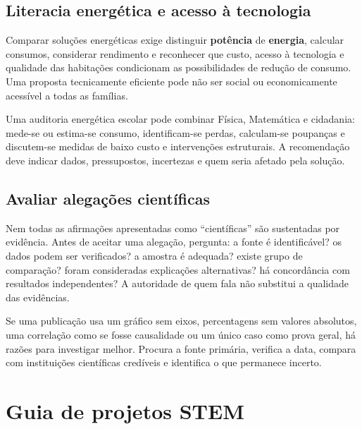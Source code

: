 \documentclass[11pt,a4paper,oneside]{book}
\begin{document}
\section{Literacia energética e acesso à tecnologia}
Comparar soluções energéticas exige distinguir \textbf{potência} de \textbf{energia}, calcular consumos, considerar rendimento e reconhecer que custo, acesso à tecnologia e qualidade das habitações condicionam as possibilidades de redução de consumo. Uma proposta tecnicamente eficiente pode não ser social ou economicamente acessível a todas as famílias.

\begin{mundo}
Uma auditoria energética escolar pode combinar Física, Matemática e cidadania: mede-se ou estima-se consumo, identificam-se perdas, calculam-se poupanças e discutem-se medidas de baixo custo e intervenções estruturais. A recomendação deve indicar dados, pressupostos, incertezas e quem seria afetado pela solução.
\end{mundo}

\section{Avaliar alegações científicas}
Nem todas as afirmações apresentadas como ``científicas'' são sustentadas por evidência. Antes de aceitar uma alegação, pergunta: a fonte é identificável? os dados podem ser verificados? a amostra é adequada? existe grupo de comparação? foram consideradas explicações alternativas? há concordância com resultados independentes? A autoridade de quem fala não substitui a qualidade das evidências.

\begin{metodo}[title=Checklist contra desinformação científica]
Se uma publicação usa um gráfico sem eixos, percentagens sem valores absolutos, uma correlação como se fosse causalidade ou um único caso como prova geral, há razões para investigar melhor. Procura a fonte primária, verifica a data, compara com instituições científicas credíveis e identifica o que permanece incerto.
\end{metodo}

\chapter{Guia de projetos STEM}
\end{document}
